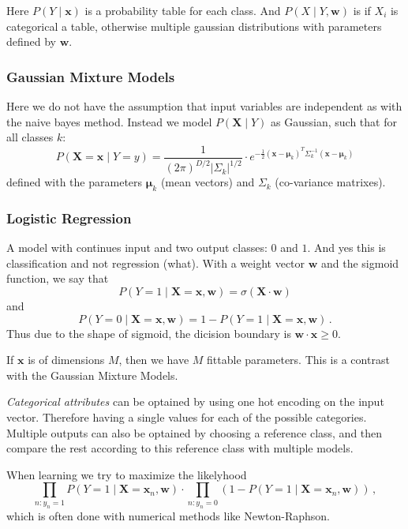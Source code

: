 Here $P(Y \mid \mathbf{x})$ is a probability table for each class.
And $P(X \mid Y, \mathbf{w})$ is if $X_i$ is categorical a table, otherwise multiple gaussian distributions with parameters defined by $\mathbf{w}$.

\subsubsection{Gaussian Mixture Models}

Here we do not have the assumption that input variables are independent as with the naive bayes method.
Instead we model $P(\mathbf{X} \mid Y)$ as Gaussian, such that for all classes $k$:
\[
    P(\mathbf{X} = \mathbf{x} \mid Y = y) = \frac 1 {(2\pi)^{D / 2} | \Sigma_k |^{1 / 2}} \cdot e^{-\frac 1 2 (\mathbf{x} - \mathbf{\mu}_k)^T \Sigma_k^{-1}(\mathbf{x} - \mathbf{\mu}_k)}
\]
defined with the parameters $\mathbf{\mu}_k$ (mean vectors) and $\Sigma_k$ (co-variance matrixes).

\subsubsection{Logistic Regression}

A model with continues input and two output classes: $0$ and $1$.
And yes this is classification and not regression (what).
With a weight vector $\mathbf{w}$ and the sigmoid function, we say that
\[
    P(Y = 1 \mid \mathbf{X} = \mathbf{x}, \mathbf{w}) = \sigma(\mathbf{X} \cdot \mathbf{w})
\]
and
\[
    P(Y = 0 \mid \mathbf{X} = \mathbf{x}, \mathbf{w}) = 1 - P(Y = 1 \mid \mathbf{X} = \mathbf{x}, \mathbf{w})\,.
\]
Thus due to the shape of sigmoid, the dicision boundary is $\mathbf{w} \cdot \mathbf{x} \geq 0$.

If $\mathbf{x}$ is of dimensions $M$, then we have $M$ fittable parameters.
This is a contrast with the Gaussian Mixture Models.

\emph{Categorical attributes} can be optained by using one hot encoding on the input vector.
Therefore having a single values for each of the possible categories.
Multiple outputs can also be optained by choosing a reference class, and then compare the rest according to this reference class with multiple models.

When learning we try to maximize the likelyhood
\[
    \prod_{n:y_n=1} P(Y = 1 \mid \mathbf{X} = \mathbf{x}_n, \mathbf{w}) \cdot \prod_{n:y_n=0} (1 - P(Y = 1 \mid \mathbf{X} = \mathbf{x}_n, \mathbf{w}))\,,
\]
which is often done with numerical methods like Newton-Raphson.

